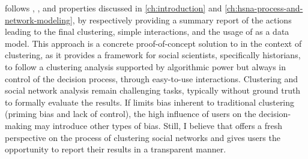 \pkclustering follows \traceability, \simplicity, and \reality properties discussed in \autoref{ch:introduction} and \autoref{ch:hsna-process-and-network-modeling}, by respectively providing a summary report of the actions leading to the final clustering, simple interactions, and the usage of \modelplural as a data model.
This approach is a concrete proof-of-concept solution to \qthree in the context of clustering, as it provides a framework for social scientists, specifically historians, to follow a clustering analysis supported by algorithmic power but always in control of the decision process, through easy-to-use interactions.
Clustering and social network analysis remain challenging tasks, typically without ground truth to formally evaluate the results.
If \pkclustering limits bias inherent to traditional clustering (priming bias and lack of control), the high influence of users on the decision-making may introduce other types of bias.
Still, I believe that \pkclustering offers a fresh perspective on the process of clustering social networks and gives users the opportunity to report their results in a transparent manner.

